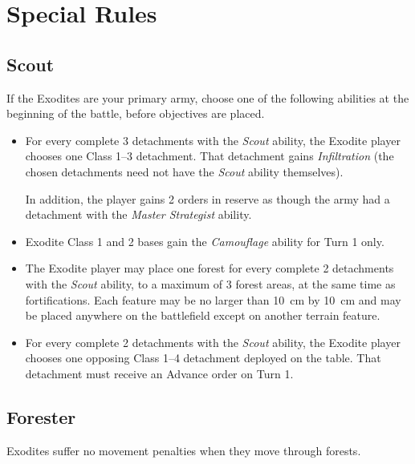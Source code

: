 \section{Special Rules}

\subsection{Scout}

If the Exodites are your primary army, choose one of the following abilities at the beginning of the battle, before objectives are placed.

\begin{itemize}
    \item For every complete 3 detachments with the \textit{Scout} ability, the Exodite player chooses one Class 1--3 detachment. That detachment gains \textit{Infiltration} (the chosen detachments need not have the \textit{Scout} ability themselves).

    In addition, the player gains 2 orders in reserve as though the army had a detachment with the \textit{Master Strategist} ability.

    \item Exodite Class 1 and 2 bases gain the \textit{Camouflage} ability for Turn 1 only.

    \item The Exodite player may place one forest for every complete 2 detachments with the \textit{Scout} ability, to a maximum of 3 forest areas, at the same time as fortifications. Each feature may be no larger than 10~cm by 10~cm and may be placed anywhere on the battlefield except on another terrain feature.

    \item For every complete 2 detachments with the \textit{Scout} ability, the Exodite player chooses one opposing Class 1--4 detachment deployed on the table. That detachment must receive an Advance order on Turn 1.
\end{itemize}

\subsection{Forester}

Exodites suffer no movement penalties when they move through forests.
